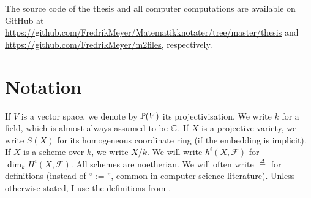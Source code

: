 The source code of the thesis and all computer computations are available on GitHub at \url{https://github.com/FredrikMeyer/Matematikknotater/tree/master/thesis} and \url{https://github.com/FredrikMeyer/m2files}, respectively.



\section{Notation}

If $V$ is a vector space, we denote by $\P(V)$ its projectivisation. We write $k$ for a field, which is almost always assumed to be $\C$. If $X$ is a projective variety, we write $S(X)$ for its homogeneous coordinate ring (if the embedding is implicit). If $X$ is a scheme over $k$, we write $X/k$. We will write $h^i(X,\mathscr F)$ for $\dim_k H^i(X,\mathscr F)$. All schemes are noetherian. We will often write $\stackrel \Delta = $ for definitions (instead of  ``$:=$'', common in computer science literature). Unless otherwise stated,  I use the definitions from \cite{hartshorne}.